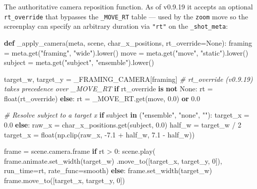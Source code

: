 \documentclass[
  11pt,
]{book}
\newenvironment{Shaded}{}{}
\newcommand{\BuiltInTok}[1]{\textcolor[rgb]{0.00,0.50,0.00}{#1}}
\newcommand{\CommentTok}[1]{\textcolor[rgb]{0.38,0.63,0.69}{\textit{#1}}}
\newcommand{\ControlFlowTok}[1]{\textcolor[rgb]{0.00,0.44,0.13}{\textbf{#1}}}
\newcommand{\DecValTok}[1]{\textcolor[rgb]{0.25,0.63,0.44}{#1}}
\newcommand{\FloatTok}[1]{\textcolor[rgb]{0.25,0.63,0.44}{#1}}
\newcommand{\KeywordTok}[1]{\textcolor[rgb]{0.00,0.44,0.13}{\textbf{#1}}}
\newcommand{\NormalTok}[1]{#1}
\newcommand{\OperatorTok}[1]{\textcolor[rgb]{0.40,0.40,0.40}{#1}}
\newcommand{\StringTok}[1]{\textcolor[rgb]{0.25,0.44,0.63}{#1}}
\newcommand{\VariableTok}[1]{\textcolor[rgb]{0.10,0.09,0.49}{#1}}
\begin{document}
The authoritative camera reposition function. As of v0.9.19 it accepts
an optional \texttt{rt\_override} that bypasses the \texttt{\_MOVE\_RT}
table --- used by the \texttt{zoom} move so the screenplay can specify
an arbitrary duration via \texttt{"rt"} on the \texttt{\_shot\_meta}:

\begin{Shaded}
\begin{Highlighting}[]
\KeywordTok{def}\NormalTok{ \_apply\_camera(meta, scene, char\_x\_positions,}
\NormalTok{                   rt\_override}\OperatorTok{=}\VariableTok{None}\NormalTok{):}
\NormalTok{    framing }\OperatorTok{=}\NormalTok{ meta.get(}\StringTok{"framing"}\NormalTok{, }\StringTok{"wide"}\NormalTok{).lower()}
\NormalTok{    move    }\OperatorTok{=}\NormalTok{ meta.get(}\StringTok{"move"}\NormalTok{,    }\StringTok{"static"}\NormalTok{).lower()}
\NormalTok{    subject }\OperatorTok{=}\NormalTok{ meta.get(}\StringTok{"subject"}\NormalTok{, }\StringTok{"ensemble"}\NormalTok{).lower()}

\NormalTok{    target\_w, target\_y }\OperatorTok{=}\NormalTok{ \_FRAMING\_CAMERA[framing]}
    \CommentTok{\# rt\_override (v0.9.19) takes precedence over \_MOVE\_RT}
    \ControlFlowTok{if}\NormalTok{ rt\_override }\KeywordTok{is} \KeywordTok{not} \VariableTok{None}\NormalTok{:}
\NormalTok{        rt }\OperatorTok{=} \BuiltInTok{float}\NormalTok{(rt\_override)}
    \ControlFlowTok{else}\NormalTok{:}
\NormalTok{        rt }\OperatorTok{=}\NormalTok{ \_MOVE\_RT.get(move, }\FloatTok{0.0}\NormalTok{) }\KeywordTok{or} \FloatTok{0.0}

    \CommentTok{\# Resolve subject to a target x}
    \ControlFlowTok{if}\NormalTok{ subject }\KeywordTok{in}\NormalTok{ (}\StringTok{"ensemble"}\NormalTok{, }\StringTok{"none"}\NormalTok{, }\StringTok{""}\NormalTok{):}
\NormalTok{        target\_x }\OperatorTok{=} \FloatTok{0.0}
    \ControlFlowTok{else}\NormalTok{:}
\NormalTok{        raw\_x  }\OperatorTok{=}\NormalTok{ char\_x\_positions.get(subject, }\FloatTok{0.0}\NormalTok{)}
\NormalTok{        half\_w }\OperatorTok{=}\NormalTok{ target\_w }\OperatorTok{/} \DecValTok{2}
\NormalTok{        target\_x }\OperatorTok{=} \BuiltInTok{float}\NormalTok{(np.clip(raw\_x,}
                                 \OperatorTok{{-}}\FloatTok{7.1} \OperatorTok{+}\NormalTok{ half\_w, }\FloatTok{7.1} \OperatorTok{{-}}\NormalTok{ half\_w))}

\NormalTok{    frame }\OperatorTok{=}\NormalTok{ scene.camera.frame}
    \ControlFlowTok{if}\NormalTok{ rt }\OperatorTok{\textgreater{}} \DecValTok{0}\NormalTok{:}
\NormalTok{        scene.play(}
\NormalTok{            frame.animate.set\_width(target\_w)}
\NormalTok{                  .move\_to([target\_x, target\_y, }\DecValTok{0}\NormalTok{]),}
\NormalTok{            run\_time}\OperatorTok{=}\NormalTok{rt, rate\_func}\OperatorTok{=}\NormalTok{smooth)}
    \ControlFlowTok{else}\NormalTok{:}
\NormalTok{        frame.set\_width(target\_w)}
\NormalTok{        frame.move\_to([target\_x, target\_y, }\DecValTok{0}\NormalTok{])}
\end{Highlighting}
\end{Shaded}
\end{document}
